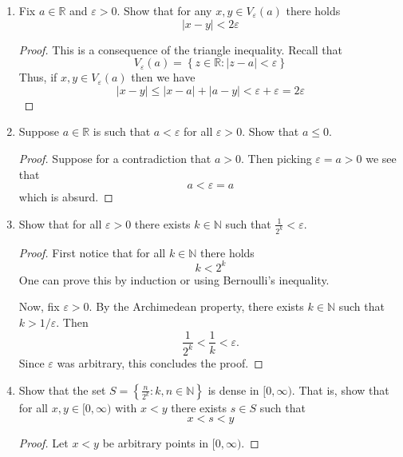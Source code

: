 \documentclass[12pt, reqno]{article}
\numberwithin{equation}{section}
\theoremstyle{definition}
\theoremstyle{remark}
\newcommand{\NN}{\mathbb{N}}
\newcommand{\RR}{\mathbb{R}}
\newcommand{\set}[1]{\left\{#1\right\}}
\newcommand{\abs}[1]{\left\lvert#1\right\rvert}
\renewcommand{\epsilon}{\varepsilon}
\begin{document}
\begin{enumerate}[leftmargin=*]
	\item Fix $a\in \RR$ and $\epsilon > 0$. Show that for any $x,y\in V_\epsilon(a)$ there holds
	      \[
		      \abs{x-y} < 2\epsilon
	      \]

	      \begin{proof}
		      This is a consequence of the triangle inequality. Recall that
		      \[
			      V_\epsilon(a) = \set{z\in \RR : \abs{z-a} < \epsilon}
		      \]
		      Thus, if $x, y\in V_\epsilon(a)$ then we have
		      \[
			      \abs{x-y}\leq \abs{x-a} + \abs{a-y} < \epsilon + \epsilon = 2\epsilon
		      \]
	      \end{proof}

	\item Suppose $a\in \RR$ is such that $a<\epsilon$ for all $\epsilon>0$. Show that $a \leq 0$.

	      \begin{proof}
		      Suppose for a contradiction that $a > 0$. Then picking $\epsilon = a > 0$ we see that
		      \[
			      a < \epsilon = a
		      \]
		      which is absurd.
	      \end{proof}

	\item\label{p4} Show that for all $\epsilon > 0$ there exists $k\in \NN$ such that $\frac{1}{2^k} < \epsilon$.

	      \begin{proof}
		      First notice that for all $k\in \NN$ there holds
		      \[
			      k < 2^k
		      \]
		      One can prove this by induction or using Bernoulli's inequality.

		      Now, fix $\epsilon>0$. By the Archimedean property, there exists $k\in\NN$ such that $k >1/\epsilon$. Then
		      \[
			      \frac{1}{2^k} <\frac{1}{k} <\epsilon.
		      \]
		      Since $\epsilon$ was arbitrary, this concludes the proof.
	      \end{proof}

	\item Show that the set $S = \set{\frac{n}{2^k} : k,n\in\NN}$ is dense in $[0,\infty)$. That is, show that for all $x,y\in [0,\infty)$ with $x<y$ there exists $s\in S$ such that
	      \[
		      x<s<y
	      \]

	      \begin{proof}
		      Let $x<y$ be arbitrary points in $[0,\infty)$.


\end{proof}
\end{enumerate}
\end{document}
